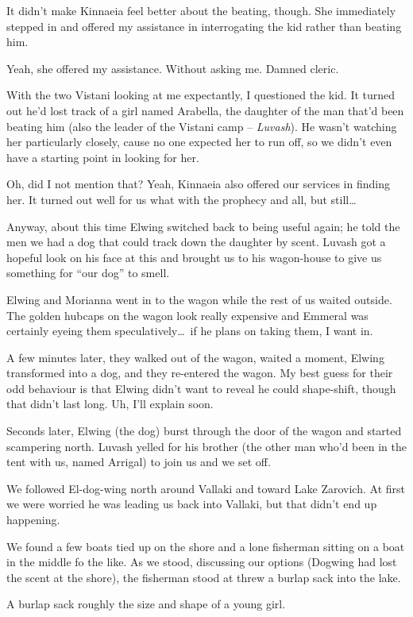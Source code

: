It didn't make Kinnaeia feel better about the beating, though. She immediately stepped in and offered my assistance in interrogating the kid rather than beating him.

Yeah, she offered my assistance. Without asking me. Damned cleric.

With the two Vistani looking at me expectantly, I questioned the kid. It turned out he'd lost track of a girl named Arabella, the daughter of the man that'd been beating him (also the leader of the Vistani camp -- \emph{Luvash}). He wasn't watching her particularly closely, cause no one expected her to run off, so we didn't even have a starting point in looking for her.

Oh, did I not mention that? Yeah, Kinnaeia also offered our services in finding her. It turned out well for us what with the prophecy and all, but still\dots

Anyway, about this time Elwing switched back to being useful again; he told the men we had a dog that could track down the daughter by scent. Luvash got a hopeful look on his face at this and brought us to his wagon-house to give us something for ``our dog'' to smell.

Elwing and Morianna went in to the wagon while the rest of us waited outside. The golden hubcaps on the wagon look really expensive and Emmeral was certainly eyeing them speculatively\dots\ if he plans on taking them, I want in.

A few minutes later, they walked out of the wagon, waited a moment, Elwing transformed into a dog, and they re-entered the wagon. My best guess for their odd behaviour is that Elwing didn't want to reveal he could shape-shift, though that didn't last long. Uh, I'll explain soon.

Seconds later, Elwing (the dog) burst through the door of the wagon and started scampering north. Luvash yelled for his brother (the other man who'd been in the tent with us, named Arrigal) to join us and we set off.

We followed El-dog-wing north around Vallaki and toward Lake Zarovich. At first we were worried he was leading us back into Vallaki, but that didn't end up happening.

We found a few boats tied up on the shore and a lone fisherman sitting on a boat in the middle fo the like. As we stood, discussing our options (Dogwing had lost the scent at the shore), the fisherman stood at threw a burlap sack into the lake.

A burlap sack roughly the size and shape of a young girl.

